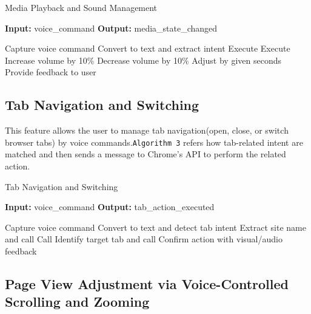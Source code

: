 \begin{algorithm}[H]
    \caption{Media Playback and Sound Management}
    \label{alg:media_control}
    \textbf{Input:} voice\_command  
    \textbf{Output:} media\_state\_changed  
    \begin{algorithmic}[1]
        \State Capture voice command
        \State Convert to text and extract intent
            \State Execute  
            \State Execute  
            \State Increase volume by 10\% 
            \State Decrease volume by 10\% 
            \State Adjust  by given seconds 
        \EndIf
        \State Provide feedback to user
    \end{algorithmic}
\end{algorithm}

\subsection{Tab Navigation and Switching}

This feature allows the user to manage tab navigation(open, close, or switch browser tabs) by voice commands.\texttt{Algorithm 3} refers how tab-related intent are matched and then sends a message to Chrome’s API to perform the related action.

\begin{algorithm}[H]
    \caption{Tab Navigation and Switching}
    \label{alg:tab_management}
    \textbf{Input:} voice\_command  
    \textbf{Output:} tab\_action\_executed  
    \begin{algorithmic}[1]
        \State Capture voice command
        \State Convert to text and detect tab intent
            \State Extract site name and call  
            \State Call  
            \State Identify target tab and call  
        \EndIf
        \State Confirm action with visual/audio feedback
    \end{algorithmic}
\end{algorithm}



\subsection{Page View Adjustment via Voice-Controlled Scrolling and Zooming}

